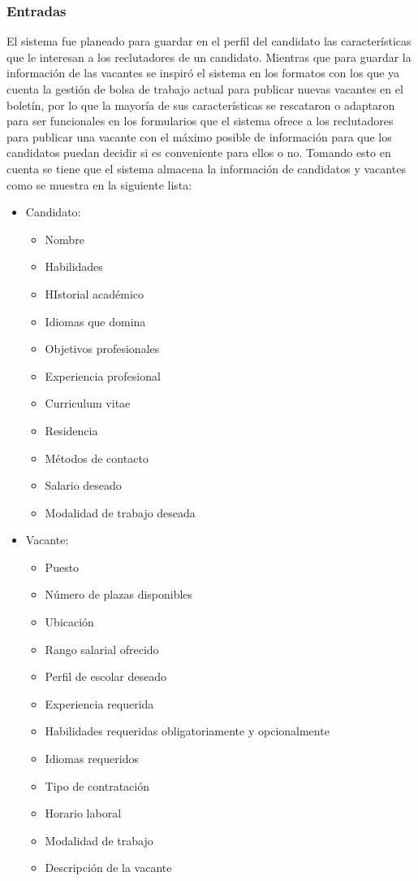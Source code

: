 \subsubsection{Entradas}
El sistema fue planeado para guardar en el perfil del candidato las características que le interesan a los reclutadores de un candidato. Mientras que para guardar la información de las vacantes se inspiró el sistema en los formatos con los que ya cuenta la gestión de bolsa de trabajo actual para publicar nuevas vacantes en el boletín, por lo que la mayoría de sus características se rescataron o adaptaron para ser funcionales en los formularios que el sistema ofrece a los reclutadores para publicar una vacante con el máximo posible de información para que los candidatos puedan decidir si es conveniente para ellos o no. Tomando esto en cuenta se tiene que el sistema almacena la información de candidatos y vacantes como se muestra en la siguiente lista:

\begin{itemize}
    \item Candidato:
    \begin{itemize}
        \item Nombre
        \item Habilidades
        \item HIstorial académico
        \item Idiomas que domina 
        \item Objetivos profesionales 
        \item Experiencia profesional
        \item Curriculum vitae
        \item Residencia
        \item Métodos de contacto
        \item Salario deseado
        \item Modalidad de trabajo deseada
    \end{itemize} 
    \item Vacante:
    \begin{itemize}
        \item Puesto
        \item Número de plazas disponibles
        \item Ubicación
        \item Rango salarial ofrecido
        \item Perfil de escolar deseado
        \item Experiencia requerida
        \item Habilidades requeridas obligatoriamente y opcionalmente
        \item Idiomas requeridos 
        \item Tipo de contratación
        \item Horario laboral
        \item Modalidad de trabajo
        \item Descripción de la vacante
    \end{itemize} 
\end{itemize} 

